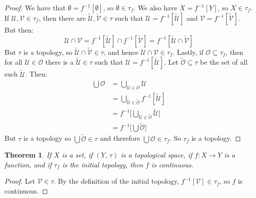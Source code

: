 \documentclass{article}
\theoremstyle{plain}
\newtheorem{theorem}{Theorem}[section]
\theoremstyle{normal}
\begin{document}
        \begin{proof}
            We have that $\emptyset=f^{-1}[\emptyset]$, so
            $\emptyset\in\tau_{f}$. We also have $X=f^{-1}[Y]$, so
            $X\in\tau_{f}$. If $\mathcal{U},\mathcal{V}\in\tau_{f}$, then
            there are $\tilde{\mathcal{U}},\tilde{\mathcal{V}}\in\tau$ such
            that $\mathcal{U}=f^{-1}[\tilde{\mathcal{U}}]$ and
            $\mathcal{V}=f^{-1}[\tilde{\mathcal{V}}]$. But then:
            \begin{equation}
                \mathcal{U}\cap\mathcal{V}
                =f^{-1}[\tilde{\mathcal{U}}]\cap{f}^{-1}[\tilde{\mathcal{V}}]
                =f^{-1}[\tilde{\mathcal{U}}\cap\tilde{\mathcal{V}}]
            \end{equation}
            But $\tau$ is a topology, so
            $\tilde{\mathcal{U}}\cap\tilde{\mathcal{V}}\in\tau$, and hence
            $\mathcal{U}\cap\mathcal{V}\in\tau_{f}$. Lastly, if
            $\mathcal{O}\subseteq\tau_{f}$, then for all
            $\mathcal{U}\in\mathcal{O}$ there is a $\tilde{\mathcal{U}}\in\tau$
            such that $\mathcal{U}=f^{-1}[\tilde{\mathcal{U}}]$. Let
            $\tilde{\mathcal{O}}\subseteq\tau$ be the set of all such
            $\tilde{\mathcal{U}}$. Then:
            \begin{align}
                \bigcup\mathcal{O}
                &=\bigcup_{\mathcal{U}\in\mathcal{O}}\mathcal{U}\\
                &=\bigcup_{\tilde{\mathcal{U}}\in\tilde{\mathcal{O}}}
                    f^{-1}[\tilde{\mathcal{U}}]\\
                &=f^{-1}\Big[
                    \bigcup_{\tilde{\mathcal{U}}\in\tilde{\mathcal{O}}}
                    \tilde{\mathcal{U}}
                \Big]\\
                &=f^{-1}\Big[
                    \bigcup\tilde{\mathcal{O}}
                \Big]
            \end{align}
            But $\tau$ is a topology so $\bigcup\tilde{\mathcal{O}}\in\tau$
            and therefore $\bigcup\mathcal{O}\in\tau_{f}$. So $\tau_{f}$
            is a topology.
        \end{proof}
        \begin{theorem}
            If $X$ is a set, if $(Y,\,\tau)$ is a topological space, if
            $f:X\rightarrow{Y}$ is a function, and if $\tau_{f}$ is the initial
            topology, then $f$ is continuous.
        \end{theorem}
        \begin{proof}
            Let $\mathcal{V}\in\tau$. By the definition of the initial topology,
            $f^{-1}[\mathcal{V}]\in\tau_{f}$, so $f$ is continuous.
        \end{proof}
\end{document}
